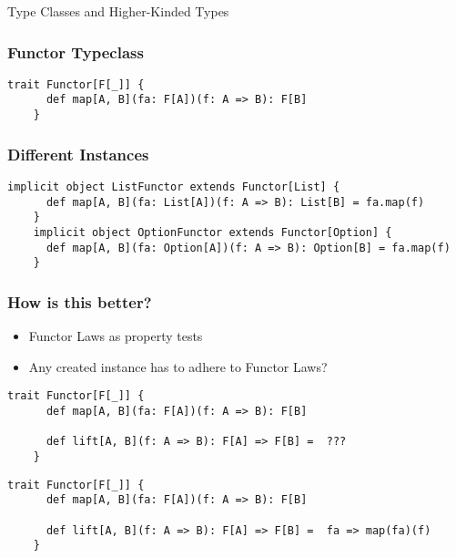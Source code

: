 \begin{section}{Type Classes and Higher-Kinded Types}
\begin{frame}[fragile]
  \frametitle{Functor Typeclass}
  \begin{lstlisting}[style=scala]
    trait Functor[F[_]] {
      def map[A, B](fa: F[A])(f: A => B): F[B]
    }
  \end{lstlisting}
\end{frame}

\begin{frame}[fragile]
  \frametitle{Different Instances}
  \begin{lstlisting}[style=scala]
    implicit object ListFunctor extends Functor[List] {
      def map[A, B](fa: List[A])(f: A => B): List[B] = fa.map(f)
    }
    implicit object OptionFunctor extends Functor[Option] {
      def map[A, B](fa: Option[A])(f: A => B): Option[B] = fa.map(f)
    }
  \end{lstlisting}
\end{frame}

\begin{frame}[fragile]
  \frametitle{How is this better?}
  \begin{itemize}
  \item Functor Laws as property tests
  \item Any created instance has to adhere to Functor Laws?
  \end{itemize}
\end{frame}

\begin{frame}[fragile]
  \begin{lstlisting}[style=scala]
    trait Functor[F[_]] {
      def map[A, B](fa: F[A])(f: A => B): F[B]

      def lift[A, B](f: A => B): F[A] => F[B] =  ???
    }
  \end{lstlisting}
\end{frame}

\begin{frame}[fragile]
  \begin{lstlisting}[style=scala]
    trait Functor[F[_]] {
      def map[A, B](fa: F[A])(f: A => B): F[B]

      def lift[A, B](f: A => B): F[A] => F[B] =  fa => map(fa)(f)
    }
  \end{lstlisting}
\end{frame}
\end{section}
